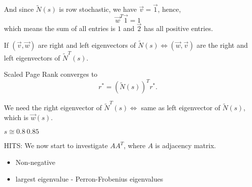 And since \(\widetilde{N}(s)\) is row stochastic, we have \(\vec{v} = \vec{1}\), hence,
\[
	\vec{w}^{T}\vec{1} = 1
\]
which means the sum of all entries is \(1\) and \(\vec{2}\) has all positive entries.

If \((\vec{v}, \vec{w})\) are right and left eigenvectors of \(\widetilde{N}(s) \iff (\vec{w}, \vec{v})\) are the right and left eigenvectors
of \(\widetilde{N}^{T}(s)\).

Scaled Page Rank converges to
\[
	r^{*} = (\widetilde{N}(s))^{T}r^{*}.
\]

We need the right eigenvector of \(\widetilde{N}^{T}(s) \iff \) same as left eigenvector of \(\widetilde{N}(s)\), which is \(\vec{w}(s)\).

\begin{remark}
	\(s \cong 0.8 ~ 0.85\)
\end{remark}

\begin{prev}
	HITS: We now start to investigate \(A A^{T}\), where \(A\) is adjacency matrix.
	\begin{itemize}
		\item Non-negative
		\item largest eigenvalue - Perron-Frobenius eigenvalues
	\end{itemize}
\end{prev}
